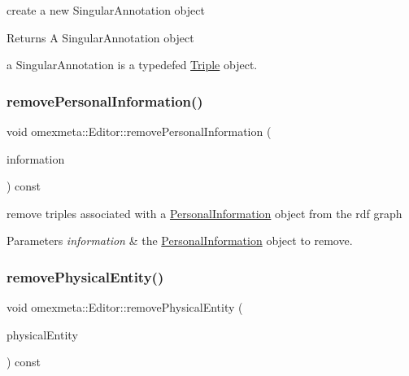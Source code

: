 create a new Singular\+Annotation object 

\begin{DoxyReturn}{Returns}
A Singular\+Annotation object
\end{DoxyReturn}
a Singular\+Annotation is a typedefed \hyperlink{classomexmeta_1_1Triple}{Triple} object. \mbox{\label{classomexmeta_1_1Editor_a8be7fa01bef49ff1c93965781797c9bc}} 
\subsubsection{\texorpdfstring{remove\+Personal\+Information()}{removePersonalInformation()}}
{\footnotesize\ttfamily void omexmeta\+::\+Editor\+::remove\+Personal\+Information (\begin{DoxyParamCaption}\item[{\hyperlink{classomexmeta_1_1PersonalInformation}{Personal\+Information} $\ast$}]{information }\end{DoxyParamCaption}) const}



remove triples associated with a \hyperlink{classomexmeta_1_1PersonalInformation}{Personal\+Information} object from the rdf graph 


\begin{DoxyParams}{Parameters}
{\em information} & the \hyperlink{classomexmeta_1_1PersonalInformation}{Personal\+Information} object to remove. \\
\hline
\end{DoxyParams}
\mbox{\label{classomexmeta_1_1Editor_a0acf94314252b70a4db89f83e6047e8f}} 
\subsubsection{\texorpdfstring{remove\+Physical\+Entity()}{removePhysicalEntity()}}
{\footnotesize\ttfamily void omexmeta\+::\+Editor\+::remove\+Physical\+Entity (\begin{DoxyParamCaption}\item[{\hyperlink{classomexmeta_1_1PhysicalEntity}{Physical\+Entity} \&}]{physical\+Entity }\end{DoxyParamCaption}) const}



